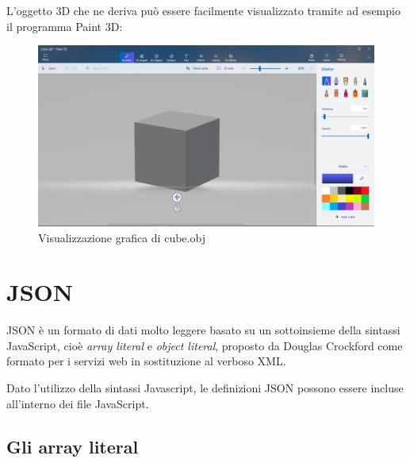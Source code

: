 \newpage
L'oggetto 3D che ne deriva può essere facilmente visualizzato tramite ad esempio il programma Paint 3D:

\begin{figure}[h]
	\centering
	\includegraphics[scale=0.35]{Immagini/cube_obj.png}
	\caption{Visualizzazione grafica di cube.obj}
\end{figure}

\section{JSON}
JSON è un formato di dati molto leggere basato su un sottoinsieme della sintassi JavaScript, cioè \emph{array literal} e \emph{object literal}, proposto da Douglas Crockford come formato per i servizi web in sostituzione al verboso XML.

Dato l'utilizzo della sintassi Javascript, le definizioni JSON\cite{json} possono essere incluse all'interno dei file JavaScript\cite{javascript}.
\subsection{Gli array literal}

